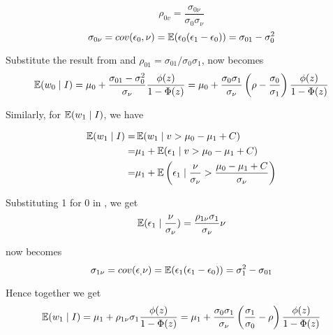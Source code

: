 \begin{equation*}
    \rho_{0v} = \frac{\sigma_{0\nu}}{\sigma_0\sigma_\nu}
\end{equation*}
\begin{equation}
    \label{eq:cov_0_nu}
    \sigma_{0\nu}=cov(\epsilon_0, \nu)=\operatorname{\mathbb{E}}(\epsilon_0 (\epsilon_1 - \epsilon_0)) = \sigma_{01}-\sigma_0^2
\end{equation}

Substitute the result from  and $\rho_{01}=\sigma_{01}/\sigma_0\sigma_1$, 
 now becomes
\begin{equation}
    \label{eq:E_0_I}
    \operatorname{\mathbb{E}}(w_{0} \mid I) = 
    \mu_0 + \frac{\sigma_{01}-\sigma_0^2}{\sigma_\nu} \frac{\phi(z)}{1-\Phi(z)}
    =\mu_0 + \frac{\sigma_0 \sigma_1}{\sigma_\nu}\left(
        \rho - \frac{\sigma_0}{\sigma_1}
    \right)\frac{\phi(z)}{1-\Phi(z)}
\end{equation}

Similarly, for $\operatorname{\mathbb{E}}(w_1 \mid I)$, we have

\begin{align*}
    \operatorname{\mathbb{E}}(w_{1} \mid I) =& \operatorname{\mathbb{E}}(w_{1} \mid v > \mu_0 - \mu_1 + C)  \\
    =& \mu_1 + \operatorname{\mathbb{E}}(\epsilon_1 \mid  v > \mu_0 - \mu_1 + C )  \\
    =& \mu_1 + \operatorname{\mathbb{E}} \left(
            \epsilon_1 \mid \frac{\nu}{\sigma_\nu} > \frac{\mu_0 - \mu_1 + C}{\sigma_\nu}
            \right)
\end{align*}

Substituting 1 for 0 in , we get
\begin{equation}
    \label{eq:biv_normal_exp_1}
    \operatorname{\mathbb{E}}(\epsilon_1 \mid \frac{\nu}{\sigma_\nu})
    =\frac{\rho_{1\nu}\sigma_1}{\sigma_\nu}\nu
\end{equation}

 now becomes
\begin{equation}
    \label{eq:cov_1_nu}
    \sigma_{1\nu}=cov(\epsilon_, \nu)=
    \operatorname{\mathbb{E}}(\epsilon_1 (\epsilon_1 - \epsilon_0)) = \sigma_{1}^2-\sigma_{01}
\end{equation}

Hence together we get
\begin{equation}
    \label{eq:E_1_I}
    \operatorname{\mathbb{E}}(w_{1} \mid I) = 
    \mu_1 + \rho_{1\nu}\sigma_1 \frac{\phi(z)}{1-\Phi(z)}
    =\mu_1 + \frac{\sigma_0 \sigma_1}{\sigma_\nu}\left(
        \frac{\sigma_1}{\sigma_0} - \rho
    \right)\frac{\phi(z)}{1-\Phi(z)}
\end{equation}




